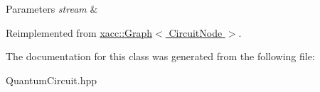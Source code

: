 \begin{DoxyParams}{Parameters}
{\em stream} & \\
\hline
\end{DoxyParams}


Reimplemented from \hyperlink{a00043_abdd3e67dc08c223821d809bc8914164a}{xacc\+::\+Graph$<$ Circuit\+Node $>$}.



The documentation for this class was generated from the following file\+:\begin{DoxyCompactItemize}
\item 
Quantum\+Circuit.\+hpp\end{DoxyCompactItemize}
